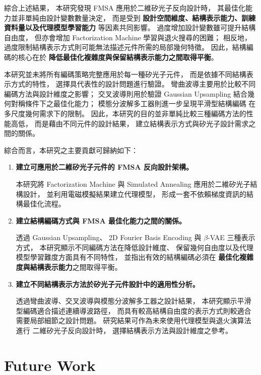 綜合上述結果，
本研究發現 FMSA 應用於二維矽光子反向設計時，
其最佳化能力並非單純由設計變數數量決定，
而是受到
\textbf{設計空間維度、結構表示能力、訓練資料量以及代理模型學習能力}
等因素共同影響。
過度增加設計變數雖可提升結構自由度，
但亦會增加 Factorization Machine 學習與退火搜尋的困難；
相反地，過度限制結構表示方式則可能無法描述元件所需的局部幾何特徵。
因此，結構編碼的核心在於
\textbf{降低最佳化複雜度與保留結構表示能力之間取得平衡}。

本研究並未將所有編碼策略完整應用於每一種矽光子元件，
而是依據不同結構表示方式的特性，
選擇具代表性的設計問題進行驗證。
彎曲波導主要用於比較不同編碼方法與設計維度之影響；
交叉波導則用於驗證 Gaussian Upsampling
結合幾何對稱條件下之最佳化能力；
模態分波解多工器則進一步呈現平滑型結構編碼
在多尺度幾何需求下的限制。
因此，本研究的目的並非單純比較三種編碼方法的性能高低，
而是藉由不同元件的設計結果，
建立結構表示方式與矽光子設計需求之間的關係。

綜合而言，本研究之主要貢獻可歸納如下：

\begin{enumerate}

\item \textbf{建立可應用於二維矽光子元件的 FMSA 反向設計架構。}

本研究將 Factorization Machine 與 Simulated Annealing
應用於二維矽光子結構設計，
並利用電磁模擬結果建立代理模型，
形成一套不依賴梯度資訊的結構最佳化流程。

\item \textbf{建立結構編碼方式與 FMSA 最佳化能力之間的關係。}

透過 Gaussian Upsampling、
2D Fourier Basis Encoding 與 $\beta$-VAE 三種表示方式，
本研究顯示不同編碼方法在降低設計維度、
保留幾何自由度以及代理模型學習難度方面具有不同特性，
並指出有效的結構編碼必須在
\textbf{最佳化複雜度與結構表示能力}之間取得平衡。

\item \textbf{建立不同結構表示方法於矽光子元件設計中的適用性分析。}

透過彎曲波導、交叉波導與模態分波解多工器之設計結果，
本研究顯示平滑型編碼適合描述連續導波路徑，
而具有較高結構自由度的表示方式則較適合需要局部細節之設計問題。
研究結果可作為未來使用代理模型與退火演算法進行
二維矽光子反向設計時，
選擇結構表示方法與設計維度之參考。

\end{enumerate}
\section{Future Work}
\label{ch:futurework}

